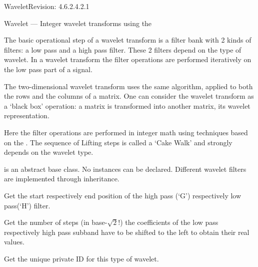 \begin{manpage}{\libtitle}{Wavelet}{$ $Revision: 4.6.2.4.2.1 $ $}

\subtitle{Name}
    Wavelet --- Integer wavelet transforms using the 


\subtitle{Description}
    The basic operational step of a wavelet transform is a filter bank with 2
    kinds of filters: a low pass and a high pass filter. These 2 filters depend
    on the type of wavelet. In a wavelet transform the filter operations are
    performed iteratively on the low pass part of a signal.

    The two-dimensional wavelet transform uses the same algorithm, applied to
    both the rows and the columns of a matrix. One can consider the wavelet
    transform as a `black box' operation: a matrix is transformed into another
    matrix, its wavelet representation.

    Here the filter operations are performed in integer math using techniques
    based on the .  The sequence of Lifting steps is
    called a `Cake Walk' and strongly depends on the wavelet type.


\subtitle{Declaration}

     is an abstract base class. No instances can be declared.
    Different wavelet filters are implemented through inheritance.


\subtitle{Public \\ Operations}

    Get the start respectively end position of the high pass (`G') respectively
    low pass(`H') filter.

    Get the number of steps (in base-$\sqrt{2}$!) the coefficients of the low
    pass respectively high pass subband have to be shifted to the left to
    obtain their real values.

    Get the unique private ID for this type of wavelet.


\end{manpage}
